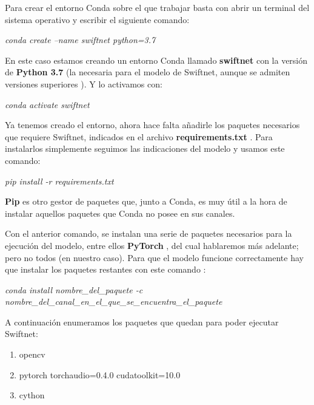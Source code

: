 Para crear el entorno Conda sobre el que trabajar basta con abrir un terminal del sistema operativo y escribir el siguiente comando:

\begin{center}
\textit{conda create --name swiftnet python=3.7}
\end{center}

En este caso estamos creando un entorno Conda llamado \textbf{swiftnet} con la versión de \textbf{Python 3.7} (la necesaria para el modelo de Swiftnet, aunque se admiten versiones superiores  \cite{github_swiftnet}). Y lo activamos con:

\begin{center}
\textit{conda activate swiftnet}
\end{center}

Ya tenemos creado el entorno, ahora hace falta añadirle los paquetes necesarios que requiere Swiftnet, indicados en el archivo \textbf{requirements.txt} \cite{github_swiftnet}. Para instalarlos simplemente seguimos las indicaciones del modelo y usamos este comando:

\begin{center}
\textit{pip install -r requirements.txt}
\end{center}

\textbf{Pip} \cite{pip} es otro gestor de paquetes que, junto a Conda, es muy útil a la hora de instalar aquellos paquetes que Conda no posee en sus canales.

Con el anterior comando, se instalan una serie de paquetes necesarios para la ejecución del modelo, entre ellos \textbf{PyTorch} \cite{pytorch}, del cual hablaremos más adelante; pero no todos (en nuestro caso). Para que el modelo funcione correctamente hay que instalar los paquetes restantes con este comando \cite{conda_sheet}:

\begin{center}
\textit{conda install nombre\_del\_paquete -c nombre\_del\_canal\_en\_el\_que\_se\_encuentra\_el\_paquete}
\end{center}

A continuación enumeramos los paquetes que quedan para poder ejecutar Swiftnet:

\begin{enumerate}
\item opencv \cite{opencv}
\item pytorch torchaudio=0.4.0 cudatoolkit=10.0 \cite{pytorch}
\item cython
\end{enumerate}

